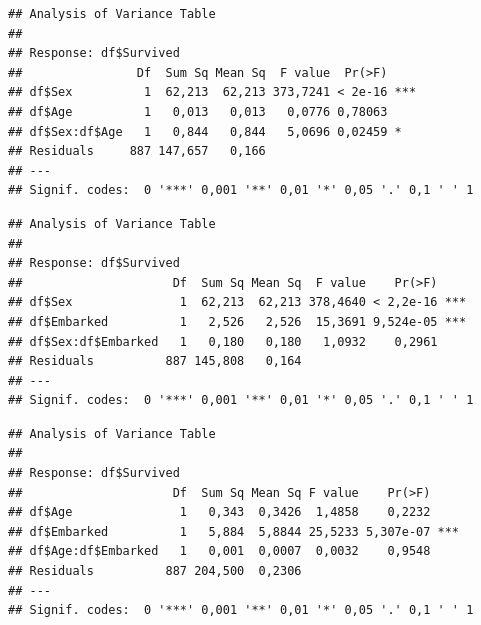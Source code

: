 \documentclass[]{article}
\newenvironment{Shaded}{\begin{snugshade}}{\end{snugshade}}
\newcommand{\KeywordTok}[1]{\textcolor[rgb]{0.13,0.29,0.53}{\textbf{#1}}}
\newcommand{\StringTok}[1]{\textcolor[rgb]{0.31,0.60,0.02}{#1}}
\newcommand{\OperatorTok}[1]{\textcolor[rgb]{0.81,0.36,0.00}{\textbf{#1}}}
\newcommand{\NormalTok}[1]{#1}
\begin{document}
\begin{verbatim}
## Analysis of Variance Table
## 
## Response: df$Survived
##                Df  Sum Sq Mean Sq  F value  Pr(>F)    
## df$Sex          1  62,213  62,213 373,7241 < 2e-16 ***
## df$Age          1   0,013   0,013   0,0776 0,78063    
## df$Sex:df$Age   1   0,844   0,844   5,0696 0,02459 *  
## Residuals     887 147,657   0,166                     
## ---
## Signif. codes:  0 '***' 0,001 '**' 0,01 '*' 0,05 '.' 0,1 ' ' 1
\end{verbatim}

\begin{Shaded}
\end{Shaded}

\begin{verbatim}
## Analysis of Variance Table
## 
## Response: df$Survived
##                     Df  Sum Sq Mean Sq  F value    Pr(>F)    
## df$Sex               1  62,213  62,213 378,4640 < 2,2e-16 ***
## df$Embarked          1   2,526   2,526  15,3691 9,524e-05 ***
## df$Sex:df$Embarked   1   0,180   0,180   1,0932    0,2961    
## Residuals          887 145,808   0,164                       
## ---
## Signif. codes:  0 '***' 0,001 '**' 0,01 '*' 0,05 '.' 0,1 ' ' 1
\end{verbatim}

\begin{Shaded}
\end{Shaded}

\begin{verbatim}
## Analysis of Variance Table
## 
## Response: df$Survived
##                     Df  Sum Sq Mean Sq F value    Pr(>F)    
## df$Age               1   0,343  0,3426  1,4858    0,2232    
## df$Embarked          1   5,884  5,8844 25,5233 5,307e-07 ***
## df$Age:df$Embarked   1   0,001  0,0007  0,0032    0,9548    
## Residuals          887 204,500  0,2306                      
## ---
## Signif. codes:  0 '***' 0,001 '**' 0,01 '*' 0,05 '.' 0,1 ' ' 1
\end{verbatim}
\end{document}
